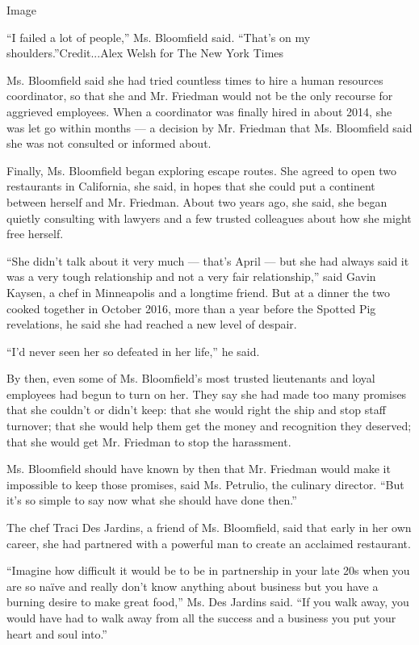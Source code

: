Image

``I failed a lot of people,'' Ms. Bloomfield said. ``That's on my
shoulders.''Credit...Alex Welsh for The New York Times

Ms. Bloomfield said she had tried countless times to hire a human
resources coordinator, so that she and Mr. Friedman would not be the
only recourse for aggrieved employees. When a coordinator was finally
hired in about 2014, she was let go within months --- a decision by Mr.
Friedman that Ms. Bloomfield said she was not consulted or informed
about.

Finally, Ms. Bloomfield began exploring escape routes. She agreed to
open two restaurants in California, she said, in hopes that she could
put a continent between herself and Mr. Friedman. About two years ago,
she said, she began quietly consulting with lawyers and a few trusted
colleagues about how she might free herself.

``She didn't talk about it very much --- that's April --- but she had
always said it was a very tough relationship and not a very fair
relationship,'' said Gavin Kaysen, a chef in Minneapolis and a longtime
friend. But at a dinner the two cooked together in October 2016, more
than a year before the Spotted Pig revelations, he said she had reached
a new level of despair.

``I'd never seen her so defeated in her life,'' he said.

By then, even some of Ms. Bloomfield's most trusted lieutenants and
loyal employees had begun to turn on her. They say she had made too many
promises that she couldn't or didn't keep: that she would right the ship
and stop staff turnover; that she would help them get the money and
recognition they deserved; that she would get Mr. Friedman to stop the
harassment.

Ms. Bloomfield should have known by then that Mr. Friedman would make it
impossible to keep those promises, said Ms. Petrulio, the culinary
director. ``But it's so simple to say now what she should have done
then.''

The chef Traci Des Jardins, a friend of Ms. Bloomfield, said that early
in her own career, she had partnered with a powerful man to create an
acclaimed restaurant.

``Imagine how difficult it would be to be in partnership in your late
20s when you are so naïve and really don't know anything about business
but you have a burning desire to make great food,'' Ms. Des Jardins
said. ``If you walk away, you would have had to walk away from all the
success and a business you put your heart and soul into.''

